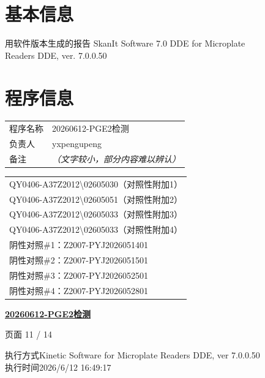 \documentclass[UTF8,10pt,a4paper,fontset=fandol]{ctexart}
\begin{document}
\vspace{1em}

\section*{基本信息}

\begin{center}
用软件版本生成的报告\qquad
SkanIt Software 7.0 DDE for Microplate\\
Readers DDE, ver. 7.0.0.50
\end{center}

\section*{程序信息}

\begin{tabular}{ll}
程序名称 & 20260612-PGE2检测 \\
负责人 & yxpengupeng \\
备注 & \textit{（文字较小，部分内容难以辨认）}
\end{tabular}

\vspace{0.5em}

\begin{tabular}{l}
QY0406-A37Z2012\textbackslash 02605030（对照性附加1）\\
QY0406-A37Z2012\textbackslash 02605051（对照性附加2）\\
QY0406-A37Z2012\textbackslash 02605033（对照性附加3）\\
QY0406-A37Z2012\textbackslash 02605033（对照性附加4）\\
阴性对照\#1：Z2007-PYJ2026051401\\
阴性对照\#2：Z2007-PYJ2026051501\\
阴性对照\#3：Z2007-PYJ2026052501\\
阴性对照\#4：Z2007-PYJ2026052801
\end{tabular}


\newpage

\noindent\textbf{\underline{20260612-PGE2检测}}

\begin{flushright}
页面 11 / 14
\end{flushright}

\noindent
执行方式\hspace{1em}Kinetic Software for Microplate Readers DDE, ver 7.0.0.50\\
执行时间\hspace{1em}2026/6/12 16:49:17
\end{document}
